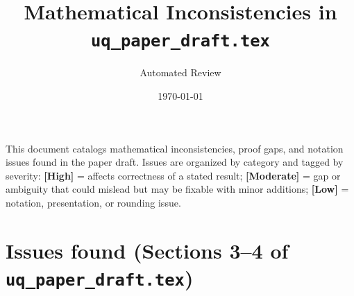 \documentclass[11pt]{article}
\title{Mathematical Inconsistencies in \texttt{uq\_paper\_draft.tex}}
\author{Automated Review}
\date{\today}
\begin{document}
\maketitle

\noindent This document catalogs mathematical inconsistencies, proof gaps, and notation issues found in the paper draft. Issues are organized by category and tagged by severity:
\textcolor{severe}{\textbf{[High]}} = affects correctness of a stated result;
\textcolor{moderate}{\textbf{[Moderate]}} = gap or ambiguity that could mislead but may be fixable with minor additions;
\textcolor{minor}{\textbf{[Low]}} = notation, presentation, or rounding issue.

\section*{Issues found (Sections 3--4 of \texttt{uq\_paper\_draft.tex})}
\end{document}
